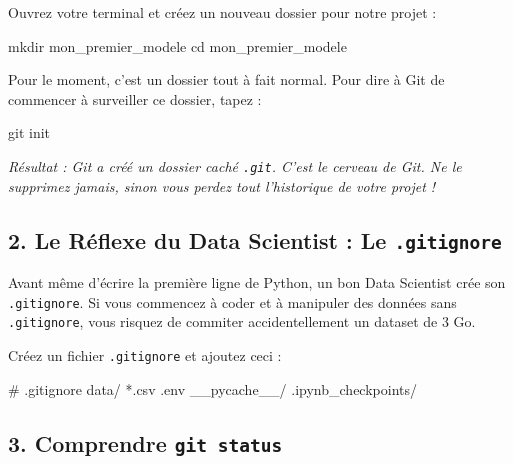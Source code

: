 \documentclass[
  letterpaper,
  DIV=11,
  numbers=noendperiod]{scrreprt}
\newenvironment{Shaded}{\begin{snugshade}}{\end{snugshade}}
\newcommand{\BuiltInTok}[1]{\textcolor[rgb]{0.00,0.23,0.31}{#1}}
\newcommand{\FunctionTok}[1]{\textcolor[rgb]{0.28,0.35,0.67}{#1}}
\newcommand{\NormalTok}[1]{\textcolor[rgb]{0.00,0.23,0.31}{#1}}
\begin{document}
Ouvrez votre terminal et créez un nouveau dossier pour notre projet :

\begin{Shaded}
\begin{Highlighting}[]
\FunctionTok{mkdir}\NormalTok{ mon\_premier\_modele}
\BuiltInTok{cd}\NormalTok{ mon\_premier\_modele}
\end{Highlighting}
\end{Shaded}

Pour le moment, c'est un dossier tout à fait normal. Pour dire à Git de
commencer à surveiller ce dossier, tapez :

\begin{Shaded}
\begin{Highlighting}[]
\FunctionTok{git}\NormalTok{ init}
\end{Highlighting}
\end{Shaded}

\emph{Résultat : Git a créé un dossier caché \texttt{.git}. C'est le
cerveau de Git. Ne le supprimez jamais, sinon vous perdez tout
l'historique de votre projet !}

\subsection{\texorpdfstring{2. Le Réflexe du Data Scientist : Le
\texttt{.gitignore}}{2. Le Réflexe du Data Scientist : Le .gitignore}}\label{le-ruxe9flexe-du-data-scientist-le-.gitignore}

Avant même d'écrire la première ligne de Python, un bon Data Scientist
crée son \texttt{.gitignore}. Si vous commencez à coder et à manipuler
des données sans \texttt{.gitignore}, vous risquez de commiter
accidentellement un dataset de 3 Go.

Créez un fichier \texttt{.gitignore} et ajoutez ceci :

\begin{Shaded}
\begin{Highlighting}[]
\NormalTok{\# .gitignore}
\NormalTok{data/}
\NormalTok{*.csv}
\NormalTok{.env}
\NormalTok{\_\_pycache\_\_/}
\NormalTok{.ipynb\_checkpoints/}
\end{Highlighting}
\end{Shaded}

\subsection{\texorpdfstring{3. Comprendre
\texttt{git\ status}}{3. Comprendre git status}}\label{comprendre-git-status}
\end{document}
